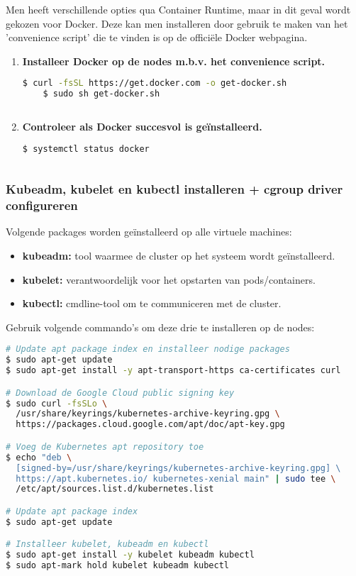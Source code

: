 Men heeft verschillende opties qua Container Runtime, maar in dit geval wordt gekozen voor Docker. Deze kan men installeren door gebruik te maken van het 'convenience script' die te vinden is op de officiële Docker webpagina. \autocite{Docker2021}
\begin{enumerate}
        \item {\bf Installeer Docker op de nodes m.b.v. het convenience script.}   
\begin{lstlisting}[language=bash]
    $ curl -fsSL https://get.docker.com -o get-docker.sh
    $ sudo sh get-docker.sh    
    
\end{lstlisting}
    
    \item {\bf Controleer als Docker succesvol is geïnstalleerd.}
\begin{lstlisting}[language=bash]  
    $ systemctl status docker
    
\end{lstlisting}
\end{enumerate}

\subsubsection{Kubeadm, kubelet en kubectl installeren + cgroup driver configureren}

Volgende packages worden geïnstalleerd op alle virtuele machines:
\begin{itemize}
    \item {\bf kubeadm:} tool waarmee de cluster op het systeem wordt geïnstalleerd.
    \item {\bf kubelet:} verantwoordelijk voor het opstarten van pods/containers.
    \item {\bf kubectl:} cmdline-tool om te communiceren met de cluster.
\end{itemize}

Gebruik volgende commando's om deze drie te installeren op de nodes:
\begin{lstlisting}[language=bash]
# Update apt package index en installeer nodige packages 
$ sudo apt-get update
$ sudo apt-get install -y apt-transport-https ca-certificates curl

# Download de Google Cloud public signing key
$ sudo curl -fsSLo \
  /usr/share/keyrings/kubernetes-archive-keyring.gpg \ 
  https://packages.cloud.google.com/apt/doc/apt-key.gpg

# Voeg de Kubernetes apt repository toe 
$ echo "deb \
  [signed-by=/usr/share/keyrings/kubernetes-archive-keyring.gpg] \ 
  https://apt.kubernetes.io/ kubernetes-xenial main" | sudo tee \
  /etc/apt/sources.list.d/kubernetes.list

# Update apt package index 
$ sudo apt-get update

# Installeer kubelet, kubeadm en kubectl
$ sudo apt-get install -y kubelet kubeadm kubectl
$ sudo apt-mark hold kubelet kubeadm kubectl

\end{lstlisting}

